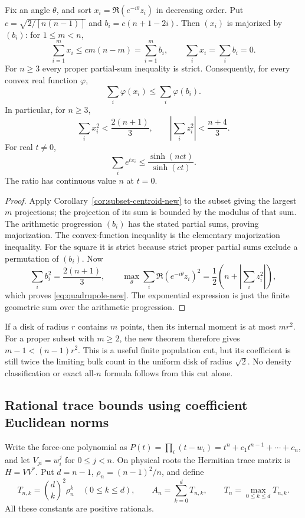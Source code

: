 \begin{proposition}\label{prop:projection-new}
Fix an angle $\theta$, and sort
$x_i=\Re(e^{-i\theta}z_i)$ in decreasing order. Put
$c=\sqrt{2/[n(n-1)]}$ and $b_i=c(n+1-2i)$. Then $(x_i)$ is
majorized by $(b_i)$: for $1\le m<n$,
\[
 \sum_{i=1}^m x_i\le c m(n-m)=\sum_{i=1}^m b_i,
 \qquad \sum_i x_i=\sum_i b_i=0.
\]
For $n\ge3$ every proper partial-sum inequality is strict. Consequently,
for every convex real function $\varphi$,
\[
                   \sum_i\varphi(x_i)\le\sum_i\varphi(b_i).
\]
In particular, for $n\ge3$,
\begin{equation}\label{eq:quadrupole-new}
 \sum_i x_i^2<\frac{2(n+1)}3,\qquad
 \left|\sum_i z_i^2\right|<\frac{n+4}3.
\end{equation}
For real $t\ne0$,
\[
 \sum_i e^{t x_i}\le\frac{\sinh(nct)}{\sinh(ct)}.
\]
The ratio has continuous value $n$ at $t=0$.
\end{proposition}
\begin{proof}
Apply Corollary~\ref{cor:subset-centroid-new} to the subset giving the
largest $m$ projections; the projection of its sum is bounded by the
modulus of that sum. The arithmetic progression $(b_i)$ has the stated
partial sums, proving majorization. The convex-function inequality is
the elementary majorization inequality. For the square it is strict
because strict proper partial sums exclude a permutation of $(b_i)$.
Now
\[
 \sum_i b_i^2=\frac{2(n+1)}3,\qquad
 \max_\theta\sum_i\Re(e^{-i\theta}z_i)^2
       =\frac12\left(n+\left|\sum_i z_i^2\right|\right),
\]
which proves \eqref{eq:quadrupole-new}. The exponential expression is
just the finite geometric sum over the arithmetic progression.
\end{proof}

\begin{remark}
If a disk of radius $r$ contains $m$ points, then its internal moment
is at most $mr^2$. For a proper subset with $m\ge2$, the new theorem
therefore gives $m-1<(n-1)r^2$. This is a useful finite population cut,
but its coefficient is still twice the limiting bulk count in the
uniform disk of radius $\sqrt2$. No density classification or exact
all-$n$ formula follows from this cut alone.
\end{remark}

\subsection{Rational trace bounds using coefficient Euclidean norms}
Write the force-one polynomial as
$P(t)=\prod_i(t-w_i)=t^n+c_1t^{n-1}+\cdots+c_n$, and let
$V_{ji}=w_i^j$ for $0\le j<n$. On physical roots the Hermitian trace
matrix is $H=VV^*$. Put $d=n-1$, $\rho_n=(n-1)^2/n$, and define
\[
 T_{n,k}=\binom dk^2\rho_n^k\quad(0\le k\le d),\qquad
 A_n=\sum_{k=0}^dT_{n,k},\qquad T_n=\max_{0\le k\le d}T_{n,k}.
\]
All these constants are positive rationals.

